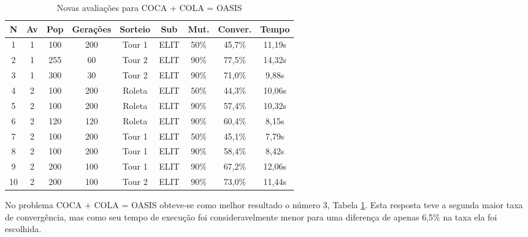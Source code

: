 \documentclass[a4paper, 12pt]{article}
\begin{document}
  \begin{table}[H]
    \centering
    \begin{tabular}{|c|c|c|c|c|c|c|c|c|}
      \hline
      N&Av & Pop & Gerações & Sorteio & Sub & Mut. & Conver. & Tempo  \\
      \hline
      1&1& 100 & 200 & Tour 1 & ELIT & 50\% &45,7\% & 11,19s\\
      \hline
      2&1& 255 & 60 & Tour 2 & ELIT & 90\% &77,5\% & 14,32s\\
      \hline
      3&1& 300 & 30 & Tour 2 & ELIT & 90\% &71,0\% & 9,88s\\
      \hline
      4&2& 100 & 200 & Roleta & ELIT & 50\% &44,3\% & 10,06s\\
      \hline
      5&2& 100 & 200 & Roleta & ELIT & 90\% &57,4\% & 10,32s\\
      \hline
      6&2& 120 & 120 & Roleta & ELIT & 90\% &60,4\% & 8,15s\\
      \hline
      7&2& 100 & 200 & Tour 1 & ELIT & 50\% &45,1\% & 7,79s\\
      \hline
      8&2& 100 & 200 & Tour 1 & ELIT & 90\% &58,4\% & 8,42s\\
      \hline
      9&2& 200 & 100 & Tour 1 & ELIT & 90\% &67,2\% & 12,06s\\
      \hline
      10&2& 200 & 100 & Tour 2 & ELIT & 90\% &73,0\% & 11,44s\\
      \hline
    \end{tabular}
    \caption{Novas avaliações para COCA + COLA = OASIS}
    \label{tab:coca}
  \end{table}

  No problema COCA + COLA = OASIS obteve-se como melhor resultado o número 3,
  Tabela \ref{tab:coca}. Esta resposta teve a segunda  maior taxa de convergência,
  mas como seu tempo de execução foi consideravelmente menor para uma diferença
  de apenas 6,5\% na taxa ela foi escolhida.
\end{document}
